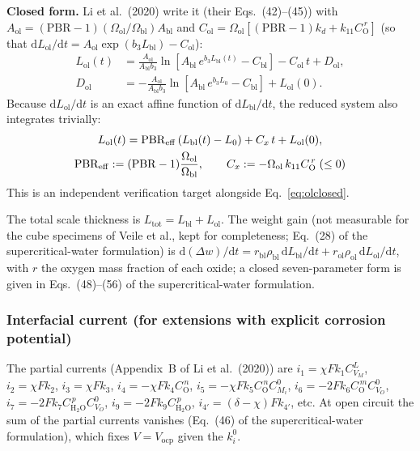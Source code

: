 \textbf{Closed form.} Li et al.\ (2020) write it
(their Eqs.~(42)--(45)) with
$A_{\mathrm{ol}} = (\mathrm{PBR}-1)
(\Omega_{\mathrm{ol}}/\Omega_{\mathrm{bl}}) A_{\mathrm{bl}}$ and
$C_{\mathrm{ol}} = \Omega_{\mathrm{ol}}
[ (\mathrm{PBR}-1) k_d + k_{11} C_{\mathrm{O}}^{\,r} ]$
(so that $\mathrm{d}L_{\mathrm{ol}}/\mathrm{d}t
= A_{\mathrm{ol}} \exp(b_3 L_{\mathrm{bl}}) - C_{\mathrm{ol}}$):
\begin{align}
L_{\mathrm{ol}}(t) &= \frac{A_{\mathrm{ol}}}{A_{\mathrm{bl}} b_3}
\ln\!\left[ A_{\mathrm{bl}}\, e^{b_3 L_{\mathrm{bl}}(t)} - C_{\mathrm{bl}} \right]
- C_{\mathrm{ol}}\, t + D_{\mathrm{ol}} ,
\label{eq:olclosed} \\
D_{\mathrm{ol}} &= -\frac{A_{\mathrm{ol}}}{A_{\mathrm{bl}} b_3}
\ln\!\left[ A_{\mathrm{bl}}\, e^{b_3 L_0} - C_{\mathrm{bl}} \right]
+ L_{\mathrm{ol}}(0) .
\end{align}
Because $\mathrm{d}L_{\mathrm{ol}}/\mathrm{d}t$ is an exact affine function of
$\mathrm{d}L_{\mathrm{bl}}/\mathrm{d}t$, the reduced system also integrates
trivially:
\begin{gather}
L_{\mathrm{ol}}(t) = \mathrm{PBR}_{\mathrm{eff}}
\left( L_{\mathrm{bl}}(t) - L_0 \right) + C_x\, t + L_{\mathrm{ol}}(0) ,
\label{eq:olaffine} \\
\mathrm{PBR}_{\mathrm{eff}} := (\mathrm{PBR}-1)
\frac{\Omega_{\mathrm{ol}}}{\Omega_{\mathrm{bl}}} ,
\qquad
C_x := -\Omega_{\mathrm{ol}}\, k_{11} C_{\mathrm{O}}^{\,r} \;(\le 0) \notag
\end{gather}
This is an independent verification target alongside Eq.~\eqref{eq:olclosed}.

The total scale thickness is
$L_{\mathrm{tot}} = L_{\mathrm{bl}} + L_{\mathrm{ol}}$. The weight gain (not
measurable for the cube specimens of Veile et al., kept for completeness;
Eq.~(28) of the supercritical-water formulation) is
$\mathrm{d}(\Delta w)/\mathrm{d}t
= r_{\mathrm{bl}} \rho_{\mathrm{bl}}\, \mathrm{d}L_{\mathrm{bl}}/\mathrm{d}t
+ r_{\mathrm{ol}} \rho_{\mathrm{ol}}\, \mathrm{d}L_{\mathrm{ol}}/\mathrm{d}t$,
with $r$ the oxygen mass fraction of each oxide; a closed seven-parameter form
is given in Eqs.~(48)--(56) of the supercritical-water formulation.

\subsubsection{Interfacial current (for extensions with explicit corrosion potential)}

The partial currents (Appendix~B of Li et al.\ (2020)) are
$i_1 = \chi F k_1 C_{V_M}^{L}$, $i_2 = \chi F k_2$, $i_3 = \chi F k_3$,
$i_4 = -\chi F k_4 C_{\mathrm{O}}^{\,n}$,
$i_5 = -\chi F k_5 C_{\mathrm{O}}^{\,n} C_{M_i}^{0}$,
$i_6 = -2 F k_6 C_{\mathrm{O}}^{\,m} C_{V_O}^{0}$,
$i_7 = -2 F k_7 C_{\mathrm{H_2O}}^{\,p} C_{V_O}^{0}$,
$i_9 = -2 F k_9 C_{\mathrm{H_2O}}^{\,p}$,
$i_{4'} = (\delta-\chi) F k_{4'}$, etc.
At open circuit the sum of the partial currents vanishes
(Eq.~(46) of the supercritical-water formulation), which fixes
$V = V_{\mathrm{ocp}}$ given the $k_i^{0}$.

